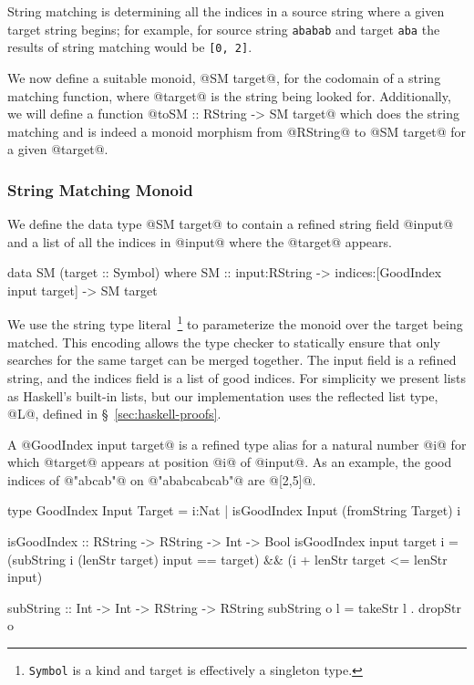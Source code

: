 String matching is determining all the indices in a source string
where a given target string begins; for example, for source string
\texttt{ababab} and target \texttt{aba} the results of string
matching would be \texttt{[0, 2]}. 

We now define a suitable monoid, @SM target@, for the codomain of
a string matching function, where @target@ is the string being looked
for.
%
Additionally, we will define a function @toSM :: RString -> SM target@
which does the string matching and is indeed a monoid morphism from
@RString@ to @SM target@ for a given @target@.

\subsubsection{String Matching Monoid}

We define the data type
@SM target@ to contain a refined string field @input@ and
a list of all the indices in @input@ where the
@target@ appears.
%
\begin{code}
  data SM (target :: Symbol) where
    SM :: input:RString
       -> indices:[GoodIndex input target]
       -> SM target
\end{code}
%
We use the string type literal~\footnote{\texttt{Symbol} is a kind and
target is effectively a singleton type.} to parameterize the monoid
over the target being matched. This encoding allows the type checker
to statically ensure that only searches for the same target can be
merged together.  The input field is a refined string, and the indices
field is a list of good indices.  For simplicity we present lists as
Haskell's built-in lists, but our implementation uses the reflected
list type, @L@, defined in \S~\ref{sec:haskell-proofs}.

A @GoodIndex input target@ is a refined type alias for a natural
number @i@ for which @target@ appears at position @i@ of @input@.  As
an example, the good indices of @"abcab"@ on @"ababcabcab"@ are
@[2,5]@.
%
\begin{code}
  type GoodIndex Input Target
    = {i:Nat | isGoodIndex Input (fromString Target) i }

  isGoodIndex :: RString -> RString -> Int -> Bool
  isGoodIndex input target i
    = (subString i (lenStr target) input  == target)
    && (i + lenStr target <= lenStr input)

  subString :: Int -> Int -> RString -> RString
  subString o l = takeStr l . dropStr o
\end{code}
%

